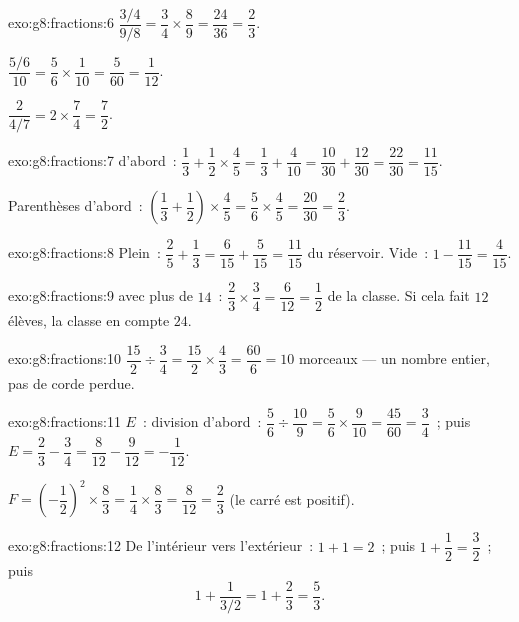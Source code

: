 \begin{solution}{exo:g8:fractions:6}
$\dfrac{3/4}{9/8} = \dfrac34 \times \dfrac89 = \dfrac{24}{36} =
\dfrac23$.

$\dfrac{5/6}{10} = \dfrac56 \times \dfrac{1}{10} = \dfrac{5}{60} =
\dfrac{1}{12}$.

$\dfrac{2}{4/7} = 2 \times \dfrac74 = \dfrac72$.
\end{solution}

\begin{solution}{exo:g8:fractions:7}
 d'abord~:
$\dfrac13 + \dfrac12 \times \dfrac45 = \dfrac13 + \dfrac{4}{10}
= \dfrac{10}{30} + \dfrac{12}{30} = \dfrac{22}{30} = \dfrac{11}{15}$.

Parenthèses d'abord~:
$\left(\dfrac13 + \dfrac12\right) \times \dfrac45
= \dfrac56 \times \dfrac45 = \dfrac{20}{30} = \dfrac23$.
\end{solution}

\begin{solution}{exo:g8:fractions:8}
Plein~: $\dfrac25 + \dfrac13 = \dfrac{6}{15} + \dfrac{5}{15} =
\dfrac{11}{15}$ du réservoir. Vide~:
$1 - \dfrac{11}{15} = \dfrac{4}{15}$.
\end{solution}

\begin{solution}{exo:g8:fractions:9}
 avec plus de $14$~:
$\dfrac23 \times \dfrac34 = \dfrac{6}{12} = \dfrac12$ de la classe.
Si cela fait $12$ élèves, la classe en compte $24$.
\end{solution}

\begin{solution}{exo:g8:fractions:10}
$\dfrac{15}{2} \div \dfrac34 = \dfrac{15}{2} \times \dfrac43
= \dfrac{60}{6} = 10$ morceaux --- un nombre entier, pas de corde
perdue.
\end{solution}

\begin{solution}{exo:g8:fractions:11}
$E$~: division d'abord~:
$\dfrac56 \div \dfrac{10}{9} = \dfrac56 \times \dfrac{9}{10}
= \dfrac{45}{60} = \dfrac34$~; puis
$E = \dfrac23 - \dfrac34 = \dfrac{8}{12} - \dfrac{9}{12} =
-\dfrac{1}{12}$.

$F = \left(-\dfrac12\right)^2 \times \dfrac83 = \dfrac14 \times
\dfrac83 = \dfrac{8}{12} = \dfrac23$ (le carré est positif).
\end{solution}

\begin{solution}{exo:g8:fractions:12}
De l'intérieur vers l'extérieur~: $1 + 1 = 2$~; puis
$1 + \dfrac12 = \dfrac32$~; puis
\[
1 + \frac{1}{3/2} = 1 + \frac23 = \frac53 .
\]
\end{solution}

